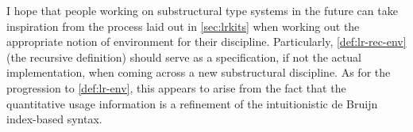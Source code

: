 I hope that people working on substructural type systems in the future can take
inspiration from the process laid out in \cref{sec:lrkits} when working out the
appropriate notion of environment for their discipline.
Particularly, \cref{def:lr-rec-env} (the recursive definition) should serve as a
specification, if not the actual implementation, when coming across a new
substructural discipline.
As for the progression to \cref{def:lr-env}, this appears to arise from the fact
that the quantitative usage information is a refinement of the intuitionistic de
Bruijn index-based syntax.
